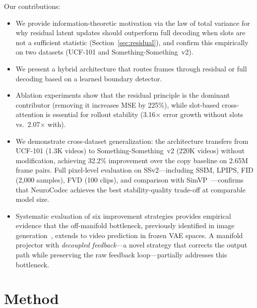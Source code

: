 \documentclass{article}
\newcommand{\method}{NeuroCodec}
\begin{document}
\noindent Our contributions:
\begin{itemize}
\item We provide information-theoretic motivation via the law of total
  variance for why residual latent updates should outperform full
  decoding when slots are not a sufficient statistic
  (Section~\ref{sec:residual}), and confirm this empirically on two
  datasets (UCF-101 and Something-Something~v2).
\item We present a hybrid architecture that routes frames through
  residual or full decoding based on a learned boundary detector.
\item Ablation experiments show that the residual principle is the
  dominant contributor (removing it increases MSE by 225\%), while
  slot-based cross-attention is essential for rollout stability
  (3.16$\times$ error growth without slots vs.\ 2.07$\times$ with).
\item We demonstrate cross-dataset generalization: the architecture
  transfers from UCF-101 (1.3K videos) to Something-Something~v2
  (220K videos) without modification, achieving 32.2\% improvement over
  the copy baseline on 2.65M frame pairs.
  Full pixel-level evaluation on SSv2---including SSIM, LPIPS, FID
  (2{,}000 samples), FVD (100 clips), and comparison with
  SimVP~\cite{gao2022simvp}---confirms that \method{} achieves the best
  stability-quality trade-off at comparable model size.
\item Systematic evaluation of six improvement strategies provides
  empirical evidence that the off-manifold bottleneck, previously
  identified in image generation~\cite{zheng2025raedit}, extends to
  video prediction in frozen VAE spaces.
  A manifold projector with \emph{decoupled feedback}---a novel
  strategy that corrects the output path while preserving the raw
  feedback loop---partially addresses this bottleneck.
\end{itemize}

\section{Method}
\label{sec:method}
\end{document}
